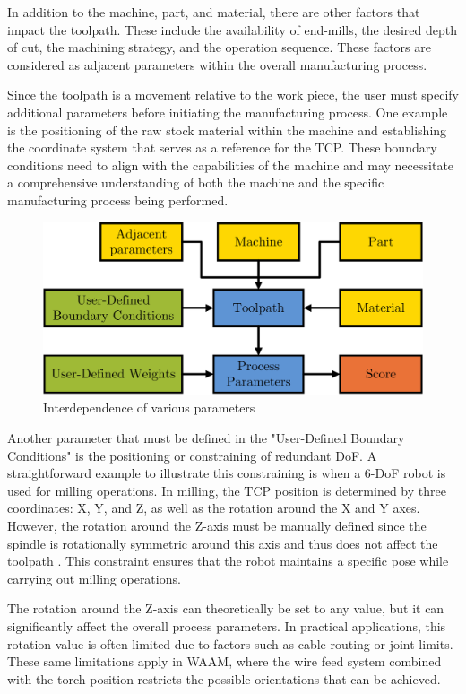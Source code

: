 In addition to the machine, part, and material, there are other factors that impact the toolpath. These include the availability of end-mills, the desired depth of cut, the machining strategy, and the operation sequence. These factors are considered as adjacent parameters within the overall manufacturing process. 


Since the toolpath is a movement relative to the work piece, the user must specify additional parameters before initiating the manufacturing process. One example is the positioning of the raw stock material within the machine and establishing the coordinate system that serves as a reference for the \acrshort{TCP}. These boundary conditions need to align with the capabilities of the machine and may necessitate a comprehensive understanding of both the machine and the specific manufacturing process being performed.


\begin{figure}[H]
	\centerline{\includegraphics[scale=.6]{figures/BasicScore.png}}
	\caption{Interdependence of various parameters}
	\label{BasicScore}
\end{figure}

Another parameter that must be defined in the "User-Defined Boundary Conditions" is the positioning or constraining of redundant \acrshort{DoF}. A straightforward example to illustrate this constraining is when a 6-\acrshort{DoF} robot is used for milling operations. In milling, the \acrshort{TCP} position is determined by three coordinates: X, Y, and Z, as well as the rotation around the X and Y axes. However, the rotation around the Z-axis must be manually defined since the spindle is rotationally symmetric around this axis and thus does not affect the toolpath . This constraint ensures that the robot maintains a specific pose while carrying out milling operations.

The rotation around the Z-axis can theoretically be set to any value, but it can significantly affect the overall process parameters. In practical applications, this rotation value is often limited due to factors such as cable routing or joint limits. These same limitations apply in \acrshort{WAAM}, where the wire feed system combined with the torch position restricts the possible orientations that can be achieved.

